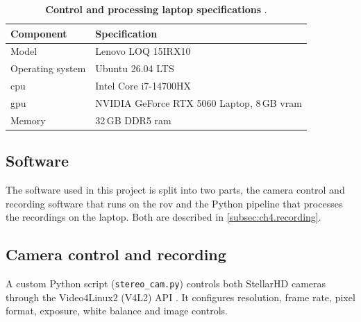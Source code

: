 \begin{table}[H]
    \centering
    \caption[Control and processing laptop specifications]{\textbf{Control and processing laptop specifications} \cite{lenovoLOQ15IRX10}.}
    \label{table:ch4.laptopspecs}
    \renewcommand{\arraystretch}{1.35}
    \begin{tabular}{@{} l l @{}}
    \toprule[2.25pt]
    \textbf{Component} & \textbf{Specification} \\
    \midrule[1pt]
    Model            & Lenovo LOQ 15IRX10 \\
    Operating system & Ubuntu 26.04 LTS \\
    \acrshort{cpu}   & Intel Core i7-14700HX \\
    \acrshort{gpu}   & NVIDIA GeForce RTX 5060 Laptop, 8\,GB \acrshort{vram} \\
    Memory           & 32\,GB DDR5 \acrshort{ram} \\
    \bottomrule[2.25pt]
    \end{tabular}
\end{table}

\subsection{Software}
\label{sec:ch4.software}
The software used in this project is split into two parts, the camera control and recording software that runs on the \gls{rov}
and the Python pipeline that processes the recordings on the laptop. Both are described in \autoref{subsec:ch4.recording}.
\subsection{Camera control and recording}
\label{subsec:ch4.recording}
A custom Python script (\texttt{stereo\_cam.py}) controls both StellarHD 
cameras through the Video4Linux2 (V4L2) API \cite{linuxV4L2}. 
It configures resolution, frame rate, pixel format, exposure,
 white balance and image controls.

